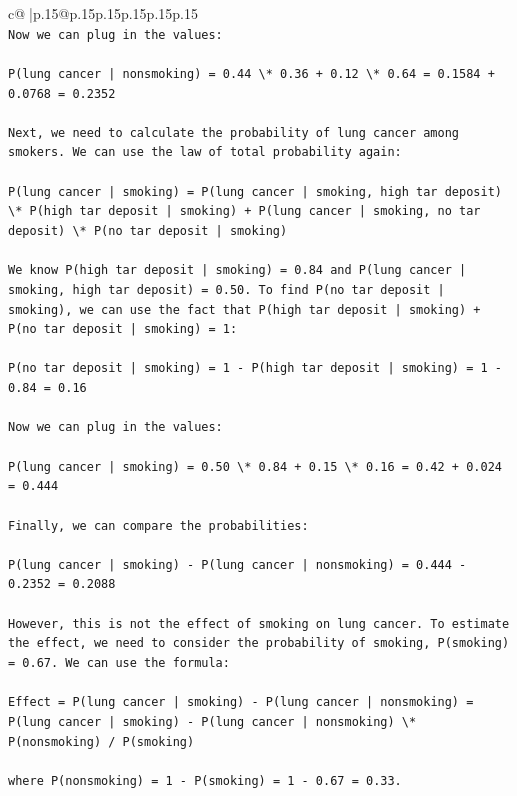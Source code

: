 \documentclass{article}
\begin{document}
{\begin{supertabular}{c@{$\;$}|p{.15\linewidth}@{}p{.15\linewidth}p{.15\linewidth}p{.15\linewidth}p{.15\linewidth}p{.15\linewidth}}
{{{\\ 
\texttt{Now we can plug in the values:} \\
\\ 
\texttt{P(lung cancer | nonsmoking) = 0.44 \textbackslash{}* 0.36 + 0.12 \textbackslash{}* 0.64 = 0.1584 + 0.0768 = 0.2352} \\
\\ 
\texttt{Next, we need to calculate the probability of lung cancer among smokers. We can use the law of total probability again:} \\
\\ 
\texttt{P(lung cancer | smoking) = P(lung cancer | smoking, high tar deposit) \textbackslash{}* P(high tar deposit | smoking) + P(lung cancer | smoking, no tar deposit) \textbackslash{}* P(no tar deposit | smoking)} \\
\\ 
\texttt{We know P(high tar deposit | smoking) = 0.84 and P(lung cancer | smoking, high tar deposit) = 0.50. To find P(no tar deposit | smoking), we can use the fact that P(high tar deposit | smoking) + P(no tar deposit | smoking) = 1:} \\
\\ 
\texttt{P(no tar deposit | smoking) = 1 {-} P(high tar deposit | smoking) = 1 {-} 0.84 = 0.16} \\
\\ 
\texttt{Now we can plug in the values:} \\
\\ 
\texttt{P(lung cancer | smoking) = 0.50 \textbackslash{}* 0.84 + 0.15 \textbackslash{}* 0.16 = 0.42 + 0.024 = 0.444} \\
\\ 
\texttt{Finally, we can compare the probabilities:} \\
\\ 
\texttt{P(lung cancer | smoking) {-} P(lung cancer | nonsmoking) = 0.444 {-} 0.2352 = 0.2088} \\
\\ 
\texttt{However, this is not the effect of smoking on lung cancer. To estimate the effect, we need to consider the probability of smoking, P(smoking) = 0.67. We can use the formula:} \\
\\ 
\texttt{Effect = P(lung cancer | smoking) {-} P(lung cancer | nonsmoking) = P(lung cancer | smoking) {-} P(lung cancer | nonsmoking) \textbackslash{}* P(nonsmoking) / P(smoking)} \\
\\ 
\texttt{where P(nonsmoking) = 1 {-} P(smoking) = 1 {-} 0.67 = 0.33.} \\
}}}
\end{supertabular}}
\end{document}
